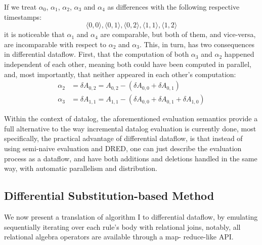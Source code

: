 \documentclass[sigconf,screen,review,natbib]{acmart}
\theoremstyle{definition}
\begin{document}
If we treat $\alpha_0$, $\alpha_1$, $\alpha_2$, $\alpha_3$ and $\alpha_4$ as differences with the following
respective timestamps: \[\langle 0, 0 \rangle, \langle 0, 1 \rangle, \langle 0, 2 \rangle, \langle 1, 1 \rangle, \langle 1, 2 \rangle\]
it is noticeable that $\alpha_1$ and $\alpha_4$ are comparable, but both of them, and vice-versa, are
incomparable with respect to $\alpha_2$ and $\alpha_3$. This, in turn, has two consequences in differential
dataflow. First, that the computation of both $\alpha_3$ and $\alpha_2$ happened independent of each other,
meaning both could have been computed in parallel, and, most importantly, that neither appeared in each other's
computation:
\begin{align*}
	\alpha_2 & = \delta A_{0, 2} = A_{0, 2} - (\delta A_{0, 0} + \delta A_{0, 1} )                  \\
	\alpha_3 & = \delta A_{1, 1} = A_{1, 1} - (\delta A_{0, 0} + \delta A_{0, 1} + \delta A_{1, 0})
\end{align*}

Within the context of datalog, the aforementioned evaluation semantics provide a full alternative to the way
incremental datalog evaluation is currently done, most specifically, the practical advantage of differential
dataflow, is that instead of using semi-naive evaluation and DRED, one can just describe the evaluation process
as a dataflow, and have both additions and deletions handled in the same way, with automatic parallelism and
distribution.

\subsection{Differential Substitution-based Method}

We now present a translation of algorithm I to differential dataflow, by emulating sequentially iterating over
each rule's body with relational joins, notably, all relational algebra operators are available through a map-
reduce-like API.
\end{document}
